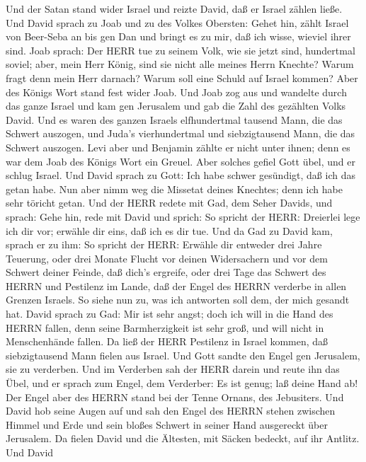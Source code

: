  Und der Satan stand wider Israel und reizte David, daß er
Israel zählen ließe.  Und David sprach zu Joab und zu des
Volkes Obersten: Gehet hin, zählt Israel von Beer-Seba an bis gen Dan
und bringt es zu mir, daß ich wisse, wieviel ihrer sind. 
Joab sprach: Der HERR tue zu seinem Volk, wie sie jetzt sind, hundertmal
soviel; aber, mein Herr König, sind sie nicht alle meines Herrn Knechte?
Warum fragt denn mein Herr darnach? Warum soll eine Schuld auf Israel
kommen?  Aber des Königs Wort stand fest wider Joab. Und
Joab zog aus und wandelte durch das ganze Israel und kam gen Jerusalem
 und gab die Zahl des gezählten Volks David. Und es waren
des ganzen Israels elfhundertmal tausend Mann, die das Schwert auszogen,
und Juda's vierhundertmal und siebzigtausend Mann, die das Schwert
auszogen.  Levi aber und Benjamin zählte er nicht unter
ihnen; denn es war dem Joab des Königs Wort ein Greuel. 
Aber solches gefiel Gott übel, und er schlug Israel.  Und
David sprach zu Gott: Ich habe schwer gesündigt, daß ich das getan habe.
Nun aber nimm weg die Missetat deines Knechtes; denn ich habe sehr
töricht getan.  Und der HERR redete mit Gad, dem Seher
Davids, und sprach:  Gehe hin, rede mit David und sprich:
So spricht der HERR: Dreierlei lege ich dir vor; erwähle dir eins, daß
ich es dir tue.  Und da Gad zu David kam, sprach er zu ihm:
So spricht der HERR: Erwähle dir  entweder drei Jahre
Teuerung, oder drei Monate Flucht vor deinen Widersachern und vor dem
Schwert deiner Feinde, daß dich's ergreife, oder drei Tage das Schwert
des HERRN und Pestilenz im Lande, daß der Engel des HERRN verderbe in
allen Grenzen Israels. So siehe nun zu, was ich antworten soll dem, der
mich gesandt hat.  David sprach zu Gad: Mir ist sehr angst;
doch ich will in die Hand des HERRN fallen, denn seine Barmherzigkeit
ist sehr groß, und will nicht in Menschenhände fallen.  Da
ließ der HERR Pestilenz in Israel kommen, daß siebzigtausend Mann fielen
aus Israel.  Und Gott sandte den Engel gen Jerusalem, sie
zu verderben. Und im Verderben sah der HERR darein und reute ihn das
Übel, und er sprach zum Engel, dem Verderber: Es ist genug; laß deine
Hand ab! Der Engel aber des HERRN stand bei der Tenne Ornans, des
Jebusiters.  Und David hob seine Augen auf und sah den
Engel des HERRN stehen zwischen Himmel und Erde und sein bloßes Schwert
in seiner Hand ausgereckt über Jerusalem. Da fielen David und die
Ältesten, mit Säcken bedeckt, auf ihr Antlitz.  Und David
